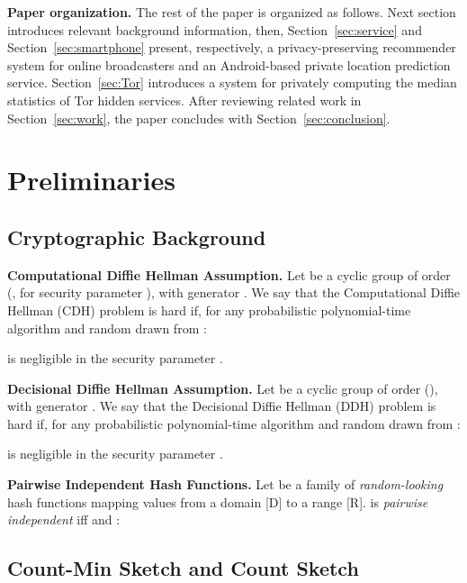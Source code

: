 \documentclass[conference]{IEEEtran}
\newcommand{\descr}[1]{\medskip \noindent \textbf{#1}}
\begin{document}
\descr{Paper organization.} The rest of the paper is organized as follows.
Next section introduces relevant background information, then, 
Section~\ref{sec:service} and Section~\ref{sec:smartphone} present, respectively, a privacy-preserving recommender system for online broadcasters and an Android-based private location prediction service. Section~\ref{sec:Tor} introduces a system for privately computing the median statistics of Tor hidden services.
After reviewing related work in Section~\ref{sec:work}, the paper concludes with Section~\ref{sec:conclusion}. 
 



\section{Preliminaries}
\label{sec:preliminaries}


\subsection{Cryptographic Background}
\label{sec:crypto}



\descr{Computational Diffie Hellman Assumption.}
Let  be a cyclic group of order  (, for  security parameter ), with generator .
We say that the Computational Diffie Hellman (CDH) problem is hard if, for any probabilistic polynomial-time algorithm  and random  drawn from : \vspace{-0.08cm}

is negligible in the security parameter .


\descr{Decisional Diffie Hellman Assumption.}
Let  be a cyclic group of order  (), with generator .
We say that the Decisional Diffie Hellman (DDH) problem is hard if, for any probabilistic polynomial-time algorithm  and random  drawn from : \vspace{-0.08cm}

is negligible in the security parameter .




\descr{Pairwise Independent Hash Functions.}
Let  be a family of {\em random-looking} 
hash functions mapping values from a domain [D] to a range [R].
 is  {\em pairwise independent} iff  and 
: 

\subsection{Count-Min Sketch and Count Sketch}
\label{sec:cms}
\end{document}
